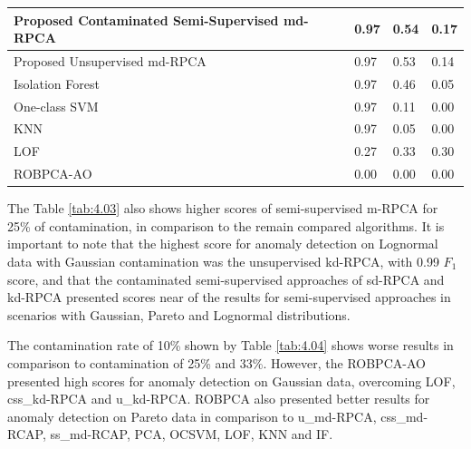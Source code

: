 \begin{table}[h!]
\begin{tabular}{| l | l | l | l |}
            Proposed Contaminated Semi-Supervised md-RPCA   &0.97  &0.54  &0.17  \\ \hline
            Proposed Unsupervised md-RPCA &0.97  &0.53  &0.14  \\ \hline
            Isolation Forest \cite{liu2008isolation}  &0.97  &0.46  &0.05  \\ \hline
            One-class SVM \cite{scholkopf2001estimating}    &0.97  &0.11  &0.00  \\ \hline
            KNN \cite{angiulli2002fast}   &0.97  &0.05  &0.00  \\ \hline
            LOF \cite{breunig2000lof}     &0.27  &0.33  &0.30  \\ \hline
            ROBPCA-AO \cite{hubert2009robustskewed}   &0.00  &0.00  &0.00  \\ \hline
	\end{tabular}
\end{table}

The Table \ref{tab:4.03} also shows higher scores of semi-supervised m-RPCA for 25\% of contamination, in comparison to the remain compared algorithms. It is important to note that the highest score for anomaly detection on Lognormal data with Gaussian contamination was the unsupervised kd-RPCA, with 0.99 $F_1$ score, and that the contaminated semi-supervised approaches of sd-RPCA and kd-RPCA presented scores near of the results for semi-supervised approaches in scenarios with Gaussian, Pareto and Lognormal distributions.

The contamination rate of 10\% shown by Table \ref{tab:4.04} shows worse results in comparison to contamination of 25\% and 33\%. However, the ROBPCA-AO presented high scores for anomaly detection on Gaussian data, overcoming LOF, css\_kd-RPCA and u\_kd-RPCA. ROBPCA also presented better results for anomaly detection on Pareto data in comparison to u\_md-RPCA, css\_md-RCAP, ss\_md-RCAP, PCA, OCSVM, LOF, KNN and IF.

